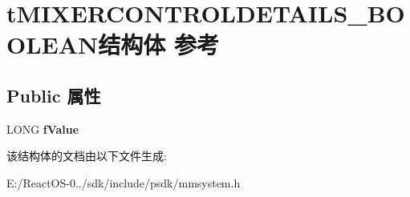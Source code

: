 \hypertarget{structt_m_i_x_e_r_c_o_n_t_r_o_l_d_e_t_a_i_l_s___b_o_o_l_e_a_n}{}\section{t\+M\+I\+X\+E\+R\+C\+O\+N\+T\+R\+O\+L\+D\+E\+T\+A\+I\+L\+S\+\_\+\+B\+O\+O\+L\+E\+A\+N结构体 参考}
\label{structt_m_i_x_e_r_c_o_n_t_r_o_l_d_e_t_a_i_l_s___b_o_o_l_e_a_n}
\subsection*{Public 属性}
\begin{DoxyCompactItemize}
\item 
\mbox{\label{structt_m_i_x_e_r_c_o_n_t_r_o_l_d_e_t_a_i_l_s___b_o_o_l_e_a_n_af9f6c5f524ef3402286f74dfbe12a463}} 
L\+O\+NG {\bfseries f\+Value}
\end{DoxyCompactItemize}


该结构体的文档由以下文件生成\+:\begin{DoxyCompactItemize}
\item 
E\+:/\+React\+O\+S-\/0../sdk/include/psdk/mmsystem.\+h\end{DoxyCompactItemize}
